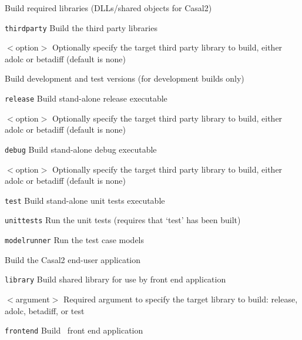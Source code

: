 Build required libraries (DLLs/shared objects for Casal2)
\begin{description}
  \item{\texttt{thirdparty}} Build the third party libraries
  \begin{description}
    \item{$<$option$>$} Optionally specify the target third party library to build, either adolc or betadiff (default is none)
  \end{description}
\end{description}

Build development and test versions (for development builds only)
\begin{description}
\item{\texttt{release}} Build stand-alone release executable
  \begin{description}
	\item{$<$option$>$} Optionally specify the target third party library to build, either adolc or betadiff (default is none)
  \end{description}
  \item{\texttt{debug}} Build stand-alone debug executable
  \begin{description}
	\item{$<$option$>$} Optionally specify the target third party library to build, either adolc or betadiff (default is none)
  \end{description}
  \item{\texttt{test}} Build stand-alone unit tests executable
  \item{\texttt{unittests}} Run the unit tests (requires that `test' has been built)
  \item{\texttt{modelrunner}} Run the test case models
\end{description}

Build the Casal2 end-user application
\begin{description}
  \item{\texttt{library}} Build shared library for use by front end application
  \begin{description}
    \item{$<$argument$>$} Required argument to specify the target library to build: release, adolc, betadiff, or test
  \end{description}
  \item{\texttt{frontend}} Build \CNAME\ front end application
\end{description}

